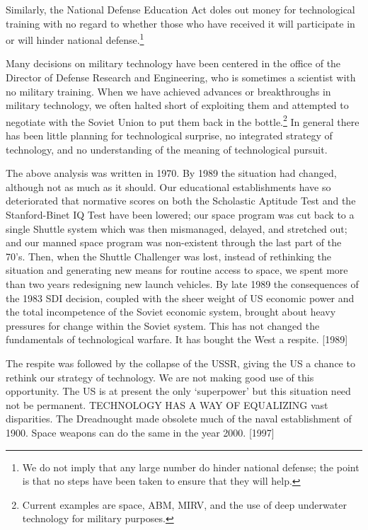 Similarly, the National Defense Education Act doles out money for technological training with no regard to whether those who have received it will participate in or will hinder national defense.\footnote{
We do not imply that any large number do hinder national defense; the point is that no steps have been taken to ensure that they will help.
}

Many decisions on military technology have been centered in the office of the Director of Defense Research and Engineering, who is sometimes a scientist with no military training. When we have achieved advances or breakthroughs in military technology, we often halted short of exploiting them and attempted to negotiate with the Soviet Union to put them back in the bottle.\footnote{
Current examples are space, ABM, MIRV, and the use of deep underwater technology for military purposes.
} In general there has been little planning for technological surprise, no integrated strategy of technology, and no understanding of the meaning of technological pursuit.

\begin{mdframed}[backgroundcolor=black!10]
The above analysis was written in 1970. By 1989 the situation had changed, although not as much as it should. Our educational establishments have so deteriorated that normative scores on both the Scholastic Aptitude Test and the Stanford-Binet IQ Test have been lowered; our space program was cut back to a single Shuttle system which was then mismanaged, delayed, and stretched out; and our manned space program was non-existent through the last part of the 70's. Then, when the Shuttle Challenger was lost, instead of rethinking the situation and generating new means for routine access to space, we spent more than two years redesigning new launch vehicles.
By late 1989 the consequences of the 1983 SDI decision, coupled with the sheer weight of US economic power and the total incompetence of the Soviet economic system, brought about heavy pressures for change within the Soviet system. This has not changed the fundamentals of technological warfare. It has bought the West a respite. [1989]

The respite was followed by the collapse of the USSR, giving the US a chance to rethink our strategy of technology. We are not making good use of this opportunity. The US is at present the only ‘superpower’ but this situation need not be permanent. TECHNOLOGY HAS A WAY OF EQUALIZING vast disparities. The Dreadnought made obsolete much of the naval establishment of 1900. Space weapons can do the same in the year 2000. [1997]
\end{mdframed}

